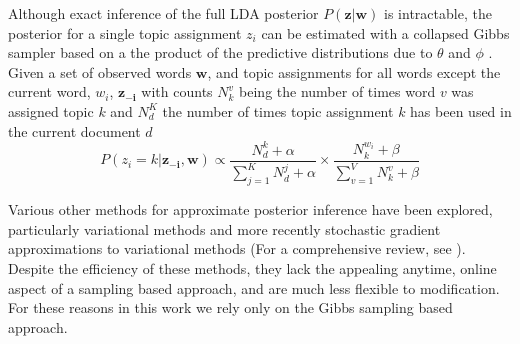 Although exact inference of the full LDA posterior $P(\boldsymbol{z} | \boldsymbol{w})$ is intractable, the posterior for a single topic assignment $z_i$ can be estimated with a collapsed Gibbs sampler based on a the product of the predictive distributions due to $\theta$ and $\phi$ \citep{griffiths2004}. Given a set of observed words $\textbf{w}$, and topic assignments for all words except the current word, $w_i$, $\boldsymbol{z_{-i}}$ with counts $N^v_k$ being the number of times word $v$ was assigned topic $k$ and $N^K_d$ the number of times topic assignment $k$ has been used in the current document $d$
\begin{equation} \label{eqn:posterior}
P(z_i = k | \boldsymbol{z_{-i}}, \boldsymbol{w}) \propto \frac{N^k_d + \alpha}{\sum_{j=1}^K N^j_d + \alpha} \times
   \frac{N^{w_i}_k + \beta}{\sum_{v=1}^V N^v_k + \beta}
\end{equation}

Various other methods for approximate posterior inference have been explored, particularly variational methods and more recently stochastic gradient approximations to variational methods (For a comprehensive review, see \citep{geigle2016}). Despite the efficiency of these methods, they lack the appealing anytime, online aspect of a sampling based approach, and are much less flexible to modification. For these reasons in this work we rely only on the Gibbs sampling based approach.

